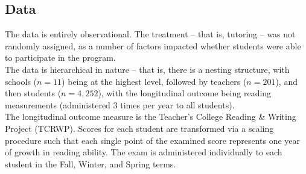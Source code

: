 \documentclass[a0,landscape]{a0poster}
\begin{document}
\begin{multicols}{3}

\subsection*{Data}

The data is entirely observational. The treatment -- that is, tutoring -- was not randomly assigned, as a number of factors impacted whether students were able to participate in the program. \\

The data is hierarchical in nature -- that is, there is a nesting structure, with schools ($n=11$) being at the highest level, followed by teachers ($n=201$), and then students ($n=4,252$), with the longitudinal outcome being reading measurements (administered 3 times per year to all students). \\

The longitudinal outcome measure is the Teacher's College Reading \& Writing Project (TCRWP). Scores for each student are transformed via a scaling procedure such that each single point of the examined score represents one year of growth in reading ability. The exam is administered individually to each student in the Fall, Winter, and Spring terms.


\end{multicols}
\end{document}

